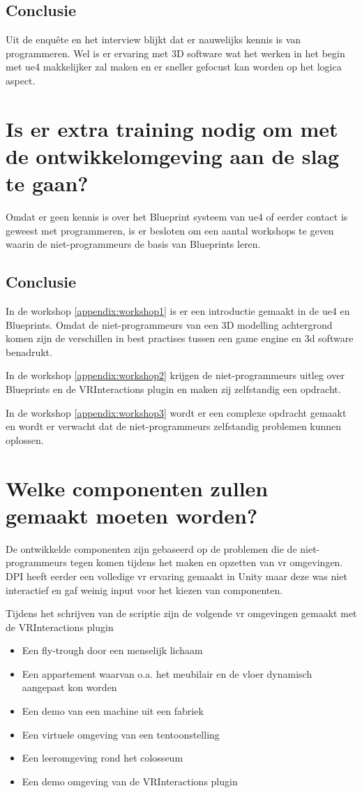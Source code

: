 \subsection{Conclusie}
Uit de enquête en het interview blijkt dat er nauwelijks kennis is van programmeren. Wel is er ervaring met 3D software wat het werken in het begin met \gls{ue4} makkelijker zal maken en er sneller gefocust kan worden op het logica aspect.

\section{Is er extra training nodig om met de ontwikkelomgeving aan de slag te gaan?}
Omdat er geen kennis is over het Blueprint systeem van \gls{ue4} of eerder contact is geweest met programmeren, is er besloten om een aantal workshops te geven waarin de niet-programmeurs de basis van Blueprints leren.

\subsection{Conclusie}
In de workshop \ref{appendix:workshop1} is er een introductie gemaakt in de \gls{ue4} en Blueprints. Omdat de niet-programmeurs van een 3D modelling achtergrond komen zijn de verschillen in best practises tussen een game engine en 3d software benadrukt.

In de workshop \ref{appendix:workshop2} krijgen de niet-programmeurs uitleg over Blueprints en de VRInteractions plugin en maken zij zelfstandig een opdracht.

In de workshop \ref{appendix:workshop3} wordt er een complexe opdracht gemaakt en wordt er verwacht dat de niet-programmeurs zelfstandig problemen kunnen oplossen.

\section{Welke componenten zullen gemaakt moeten worden?}
De ontwikkelde componenten zijn gebaseerd op de problemen die de niet-programmeurs tegen komen tijdens het maken en opzetten van \gls{vr} omgevingen. DPI heeft eerder een volledige \gls{vr} ervaring gemaakt in Unity maar deze was niet interactief en gaf weinig input voor het kiezen van componenten. 

Tijdens het schrijven van de scriptie zijn de volgende \gls{vr} omgevingen gemaakt met de VRInteractions plugin

\begin{itemize}
	\item Een fly-trough door een menselijk lichaam
	\item Een appartement waarvan o.a. het meubilair en de vloer dynamisch aangepast kon worden
	\item Een demo van een machine uit een fabriek
	\item Een virtuele omgeving van een tentoonstelling
	\item Een leeromgeving rond het colosseum
	\item Een demo omgeving van de VRInteractions plugin
\end{itemize}

